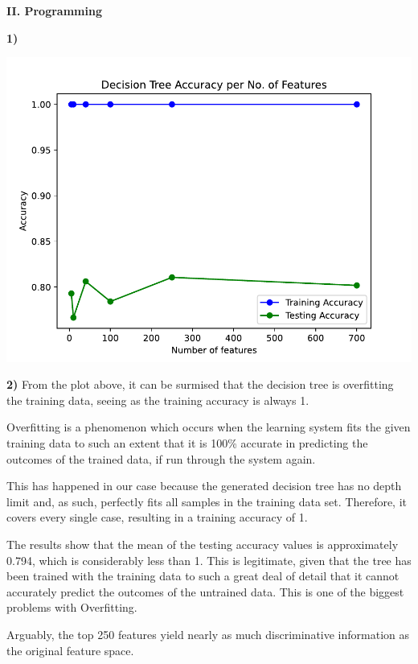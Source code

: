 \documentclass[11pt,a4paper]{article}
\begin{document}
\begin{center}
  \textbf{II. Programming}
\end{center}

\begin{flushleft}
  \textbf{1)} \par
  \includegraphics[scale=0.75]{hw01_plot.pdf}
\end{flushleft}
\vspace*{2mm}

\begin{flushleft}
  \textbf{2)}
  From the plot above, it can be surmised that the decision tree is overfitting the training data, seeing as the training accuracy is always 1.

  Overfitting is a phenomenon which occurs when the learning system fits the given training data to such an extent that it is 100\% accurate in predicting the outcomes of the trained data, if run through the system again.

  This has happened in our case because the generated decision tree has no depth limit and, as such, perfectly fits all samples in the training data set. Therefore, it covers every single case, resulting in a training accuracy of 1.

  The results show that the mean of the testing accuracy values is approximately 0.794, which is considerably less than 1. This is legitimate, given that the tree has been trained with the training data to such a great deal of detail that it cannot accurately predict the outcomes of the untrained data. This is one of the biggest problems with Overfitting.

  Arguably, the top 250 features yield nearly as much discriminative information as the original feature space.
\end{flushleft}
\end{document}
